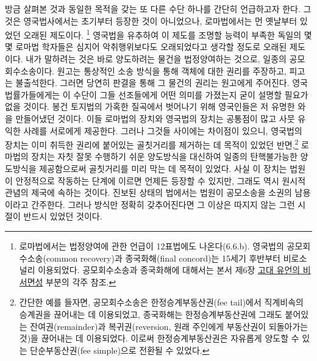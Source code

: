 방금 살펴본 것과 동일한 목적을 갖는 또 다른 수단 하나를
간단히 언급하고자 한다.
그것은 영국법사에서는 초기부터 등장한 것이 아니었으나,
로마법에서는 먼 옛날부터 있었던 오래된 제도이다.%
\footnote{%
  로마법에서는 법정양여에 관한 언급이 12표법에도 나온다(6.6.b).
  영국법의 공모회수소송(common recovery)과 종국화해(final concord)는
  15세기 후반부터 비로소 널리 이용되었다.
  공모회수소송과 종국화해에 대해서는
  본서 제6장 \hyperlink{finerecovery}{고대 유언의 비서면성} 부분의 각주 참조.
  }
영국법을 유추하여 이 제도를 조명할 능력이 부족한
독일의 몇몇 로마법 학자들은 심지어 악취행위보다도 오래되었다고
생각할 정도로 오래된 제도이다.
내가 말하려는 것은 바로
양도하려는 물건을
법정양여하는 것으로,
일종의 공모회수소송이다.
원고는 통상적인 소송 방식을 통해 객체에 대한 권리를 주장하고,
피고는 불출석한다. 그러면 당연히 판결을 통해 그 물건의 권리는
원고에게 주어진다.
영국 법률가들에게는
이 수단이 그들 선조들에게 어떤 의미를 가졌는지 굳이 설명할 필요가 없을 것이다.
봉건 토지법의 가혹한 질곡에서 벗어나기 위해
영국인들은
저 유명한
와 을 만들어냈던
것이다.
이들 로마법의 장치와 영국법의 장치는 공통점이 많고
사뭇 유익한 사례를 서로에게 제공한다.
그러나 그것들 사이에는 차이점이 있으니,
영국법의 장치는
이미 취득한 권리에 붙어있는 골칫거리를 제거하는 데 목적이 있었던
반면,\footnote{%
  간단한 예를 들자면,
  공모회수소송은 한정승계부동산권(fee tail)에서 직계비속의 승계권을
  끊어내는 데 이용되었고,
  종국화해는 한정승계부동산권에 그래도 붙어있는
  잔여권(remainder)과 복귀권(reversion,
  원래 주인에게 부동산권이 되돌아가는 것)을 끊어내는 데 이용되었다.
  이로써 한정승계부동산권은 자유롭게 양도할 수 있는
  단순부동산권(fee simple)으로 전환될 수 있었다. }
로마법의 장치는
자칫 잘못 수행하기 쉬운 양도방식을 대신하여
일종의 탄핵불가능한 양도방식을 제공함으로써 골칫거리를 미리 막는 데
목적이 있었다.
사실 이 장치는 법원이 안정적으로 작동하는 단계에 이르면
언제든 등장할 수 있지만,
그래도 역시 원시적 관념의 제국에 속하는 것이다.
진보된 상태의 법에서는 법원이
공모소송을 소권의 남용이라고 간주한다.
그러나 방식만 정확히 갖추어진다면
그 이상은 따지지 않는 그런 시절이 반드시 있었던 것이다.

